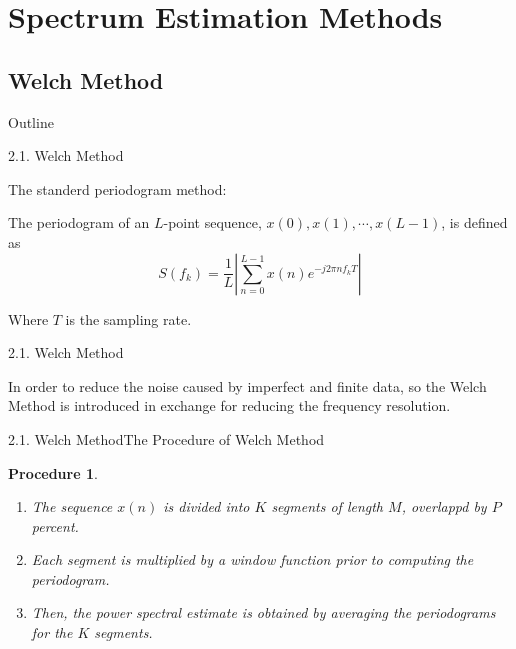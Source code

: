 \documentclass[12pt]{beamer}
\newtheorem{procedure}{Procedure}
\begin{document}
\section{Spectrum Estimation Methods}
\subsection{Welch Method}
\begin{frame}{Outline}
  \transfade%
  \tableofcontents[sectionstyle=show/shaded,subsectionstyle=show/shaded] %
\end{frame}
\begin{frame}{2.1. Welch Method}


  {\large The standerd periodogram method:}\newline

The periodogram of an $L$-point sequence, $x(0), x(1),\cdots, x(L-1)$, is defined as
\begin{equation}
  S\left(f_{k}\right)=\frac{1}{L}\left|\sum_{n=0}^{L-1} x(n) e^{-j 2 \pi n f_{k} T}\right|
\end{equation}

Where $T$ is the sampling rate.
  
\end{frame}

\begin{frame}{2.1. Welch Method}

  In order to reduce the noise caused by {\color{red} imperfect and finite data}, \pause so the Welch Method is introduced in exchange for reducing the frequency resolution.
  
\end{frame}
\begin{frame}{2.1. Welch Method}{The Procedure of Welch Method}
  \begin{procedure}
   \begin{enumerate}
    \item The sequence $x(n)$ is divided into $K$ segments of length $M$, overlappd by $P$ percent.\pause
    \item Each segment is multiplied by a window function prior to computing the periodogram.\pause
    \item Then, the power spectral estimate is obtained by averaging the periodograms for the $K$ segments.
  \end{enumerate} 
  \end{procedure}
  
   
\end{frame}
\end{document}
